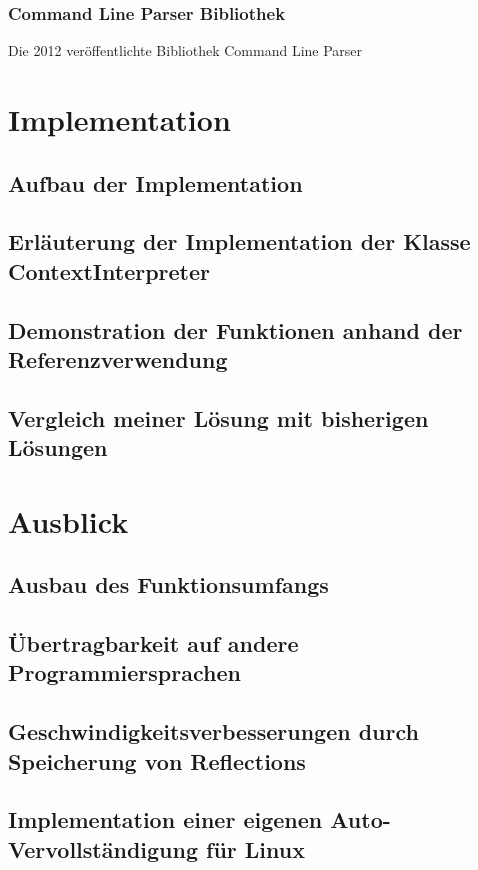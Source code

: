 \documentclass[a4paper,12pt,titlepage,ngerman,bibliography=totocnumbered]{article}
\begin{document}
\begin{sloppypar}
  \subsubsection{Command Line Parser Bibliothek}
  Die 2012 veröffentlichte Bibliothek Command Line Parser~\cite{FistCommandLineParserCommit}
  \section{Implementation}\label{sec:Content}
  \subsection{Aufbau der Implementation}\label{subsec:Architecture}
  \subsection{Erläuterung der Implementation der Klasse ContextInterpreter}\label{subsec:ConextInterpreter}
  \subsection{Demonstration der Funktionen anhand der Referenzverwendung}\label{subsec:demonstration}
  \subsection{Vergleich meiner Lösung mit bisherigen Lösungen}\label{subsec:Comparison}
  \section{Ausblick}\label{sec:Future}
  \subsection{Ausbau des Funktionsumfangs}\label{subsec:MoreFunctions}
  \subsection{Übertragbarkeit auf andere Programmiersprachen}\label{subsec:PortabilityToOtherLangs}
  \subsection{Geschwindigkeitsverbesserungen durch Speicherung von Reflections}\label{subsec:StoringReflections}
  \subsection{Implementation einer eigenen Auto-Vervollständigung für Linux}\label{subsec:Autocomplete}

\end{sloppypar}
\end{document}
